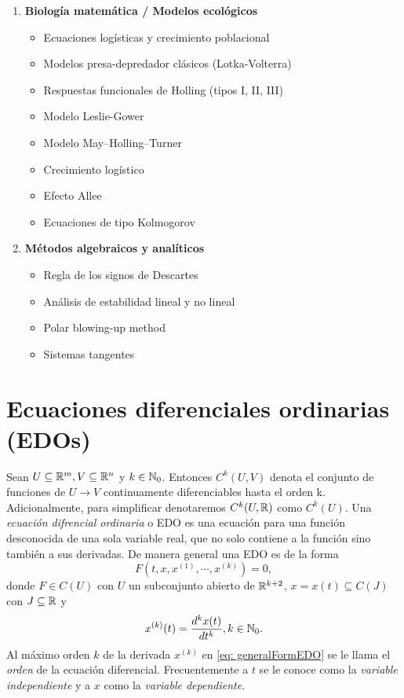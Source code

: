 \begin{enumerate}
    	\item \textbf{Biología matemática / Modelos ecológicos}
    	\begin{itemize}
    		\item Ecuaciones logísticas y crecimiento poblacional
    		\item Modelos presa-depredador clásicos (Lotka-Volterra)
    		\item Respuestas funcionales de Holling (tipos I, II, III)
    		\item Modelo Leslie-Gower
    		\item Modelo May–Holling–Turner
    		\item Crecimiento logístico
    		\item Efecto Allee
    		\item Ecuaciones de tipo Kolmogorov
    	\end{itemize}
    	
    	\item \textbf{Métodos algebraicos y analíticos}
    	\begin{itemize}
    		\item Regla de los signos de Descartes
    		\item Análisis de estabilidad lineal y no lineal
    		\item Polar blowing-up method
    		\item Sistemas tangentes
    	\end{itemize}
    \end{enumerate}
   
    \section{Ecuaciones diferenciales ordinarias (EDOs)}
    Sean $U \subseteq {\mathbb{R}}^{m}, V \subseteq {\mathbb{R}}^{n}$ y $k\in {\mathbb{N}}_{0}$. Entonces $C^{k}(U, V)$ denota el conjunto de funciones de $U \longrightarrow V$ continuamente diferenciables hasta el orden k. Adicionalmente, para simplificar denotaremos $C^{k}(U, {\mathbb{R}})$ como $C^{k}(U)$. Una \textit{ecuación difrencial ordinaria} o EDO es una ecuación para una función desconocida de una sola variable real, que no solo contiene a la función sino también a sus derivadas. De manera general una EDO es de la forma
    \begin{equation}
    	F(t, x, x^{(1)}, \cdots, x^{(k)}) = 0,
    	\label{eq: generalFormEDO}
    \end{equation}
    donde $F \in C(U)$ con $U$ un subconjunto abierto de ${\mathbb{R}}^{k+2}$, $x = x(t) \subseteq C(J)$ con $J \subseteq {\mathbb{R}}$ y
    \begin{equation*}
    	x^{(k)}(t) = \frac{d^{k}x(t)}{dt^{k}}, k \in {\mathbb{N}}_{0}.
    \end{equation*}
    Al máximo orden $k$ de la derivada $x^{(k)}$ en \eqref{eq: generalFormEDO} se le llama el \textit{orden} de la ecuación diferencial. Frecuentemente a $t$ se le conoce como la \textit{variable independiente} y a $x$ como la \textit{variable dependiente}.
    
